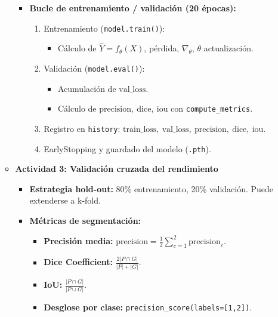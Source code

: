 \begin{enumerate}
\begin{itemize}
\begin{itemize}
    \item \textbf{Bucle de entrenamiento / validación (20 épocas):}
      \begin{enumerate}
        \item Entrenamiento (\texttt{model.train()}):
          \begin{itemize}
            \item Cálculo de \(\hat{Y}=f_\theta(X)\), pérdida, \(\nabla_\theta\), \(\theta\) actualización.
          \end{itemize}
        \item Validación (\texttt{model.eval()}):
          \begin{itemize}
            \item Acumulación de \(\mathrm{val\_loss}\).
            \item Cálculo de \(\text{precision},\ \text{dice},\ \text{iou}\) con \texttt{compute\_metrics}.
          \end{itemize}
        \item Registro en \texttt{history}: \(\mathrm{train\_loss},\ \mathrm{val\_loss},\ \mathrm{precision},\ \mathrm{dice},\ \mathrm{iou}\).
        \item EarlyStopping y guardado del modelo (\texttt{.pth}).
      \end{enumerate}
  
      \end{itemize}
  
  \vspace{0.5cm}

  \item\textbf{Actividad 3: Validación cruzada del rendimiento}
  \begin{itemize}
    \item \textbf{Estrategia hold-out:}
      80\% entrenamiento, 20\% validación. Puede extenderse a k-fold.
  
    \item \textbf{Métricas de segmentación:}
      \begin{itemize}
        \item \textbf{Precisión media:} \(\text{precision} = \frac{1}{2}\sum_{c=1}^2 \text{precision}_c\).
        \item \textbf{Dice Coefficient:} \(\frac{2|P\cap G|}{|P|+|G|}\).
        \item \textbf{IoU:} \(\frac{|P\cap G|}{|P\cup G|}\).
        \item \textbf{Desglose por clase:} \texttt{precision\_score(labels=[1,2])}.
      \end{itemize}
  

\end{itemize}
\end{itemize}
\end{enumerate}
